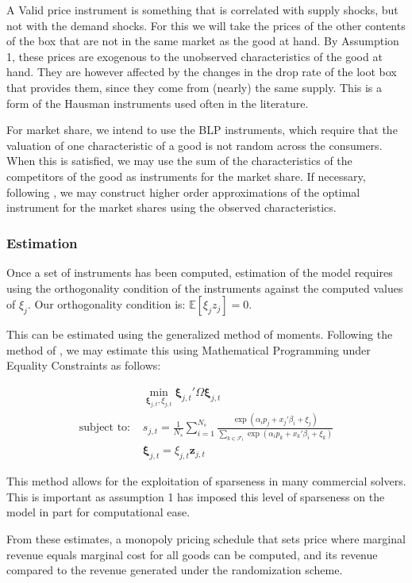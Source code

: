 \documentclass[12pt]{paper}
\newcommand{\exV}[1]{\mathbb{E} \left [ #1 \right ]}
\begin{document}
A Valid price instrument is something that is correlated with supply
shocks, but not with the demand shocks. For this we will take the
prices of the other contents of the box that are not in the same
market as the good at hand. By Assumption 1, these prices are
exogenous to the unobserved characteristics of the good at hand. They
are however affected by the changes in the drop rate of the loot box
that provides them, since they come from (nearly) the same
supply. This is a form of the Hausman instruments used often in the
literature.

For market share, we intend to use the BLP instruments, which require
that the valuation of one characteristic of a good is not random
across the consumers. When this is satisfied, we may use the sum of
the characteristics of the competitors of the good as instruments for
the market share. If necessary, following \cite{OptimalBLPInstrument}, we
may construct higher order approximations of the optimal instrument
for the market shares using the observed characteristics.

\subsubsection{Estimation}

Once a set of instruments has been computed, estimation of the model
requires using the orthogonality condition of the instruments against
the computed values of $\xi_j$. Our orthogonality condition is:
$\exV{\xi_j z_j} = 0$.

This can be estimated using the generalized method of
moments. Following the method of \cite*{MPEC}, we may estimate
this using Mathematical Programming under Equality Constraints as
follows: 

\begin{align}
  &\min_{\bm{\xi}_{j,t}, \xi_{j,t}} \bm{\xi}_{j,t}' \Omega \bm{\xi}_{j,t}\\
    \text{subject to: } &s_{j,t} = \frac{1}{N_s} \sum_{i=1}^{N_s}
                          \frac{\exp(\alpha_i p_j + x_j'\beta_i + \xi_j)}{\sum_{k\in
                          \mathcal{F}_t} \exp( \alpha_i p_k + x_k'\beta_i +
                          \xi_k)}\\
  &\bm{\xi}_{j,t} = \xi_{j,t} \bm{z}_{j,t}  
\end{align}

This  method allows for the exploitation of sparseness in many
commercial solvers. This is important as assumption 1 has imposed this
level of sparseness on the model in part for computational ease.

From these estimates, a monopoly pricing schedule that sets price
where marginal revenue equals marginal cost for all goods can be
computed, and its revenue compared to the revenue generated under the
randomization scheme.



{}
\end{document}
